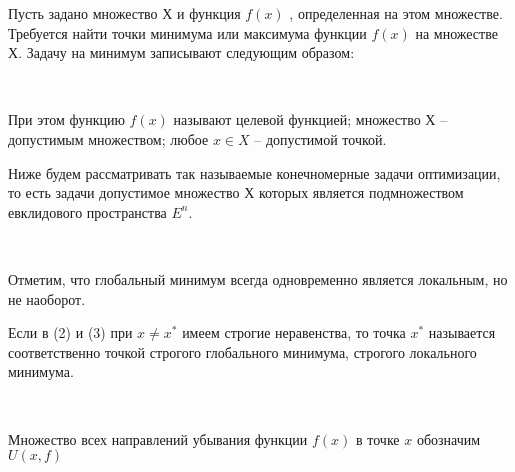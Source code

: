 
\graphicspath{ {imgs/} }






Пусть задано множество $Х$ и функция $f(x)$ , определенная на этом множестве. Требуется найти точки минимума или максимума функции $f(x)$ на множестве $Х$. Задачу на минимум записывают следующим образом:

\

При этом функцию $f(x)$ называют целевой функцией; множество $Х$ – допустимым множеством; любое $x \in X$ -- допустимой точкой.

Ниже будем рассматривать так называемые конечномерные задачи оптимизации, то есть задачи допустимое множество $Х$ которых является подмножеством евклидового пространства $E^n$.

\

Отметим, что глобальный минимум всегда одновременно является локальным, но не наоборот.

Если в (2) и (3) при $x \neq x^*$ имеем строгие неравенства, то точка $x^*$ называется соответственно точкой строгого глобального минимума, строгого локального минимума.

\

Множество всех направлений убывания функции $f(x)$ в точке $x$ обозначим $U(x, f )$

\

